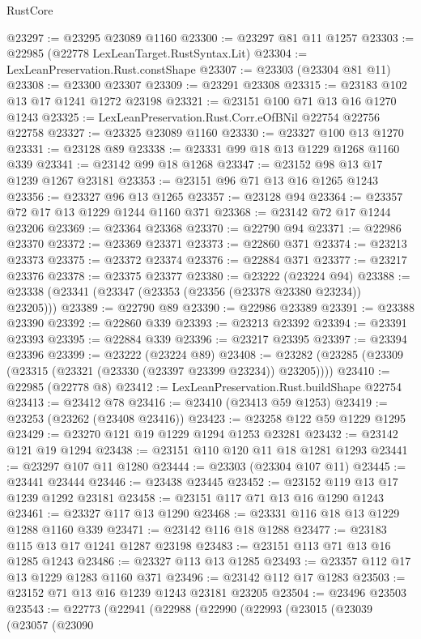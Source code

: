 \begin{lexlean}{RustCore}
\begin{coremodule}
@23297 := @23295 @23089 @1160
@23300 := @23297 @81 @11 @1257
@23303 := @22985 (@22778 LexLeanTarget.RustSyntax.Lit)
@23304 := LexLeanPreservation.Rust.constShape
@23307 := @23303 (@23304 @81 @11)
@23308 := @23300 @23307
@23309 := @23291 @23308
@23315 := @23183 @102 @13 @17 @1241 @1272 @23198
@23321 := @23151 @100 @71 @13 @16 @1270 @1243
@23325 := LexLeanPreservation.Rust.Corr.eOfBNil @22754 @22756 @22758
@23327 := @23325 @23089 @1160
@23330 := @23327 @100 @13 @1270
@23331 := @23128 @89
@23338 := @23331 @99 @18 @13 @1229 @1268 @1160 @339
@23341 := @23142 @99 @18 @1268
@23347 := @23152 @98 @13 @17 @1239 @1267 @23181
@23353 := @23151 @96 @71 @13 @16 @1265 @1243
@23356 := @23327 @96 @13 @1265
@23357 := @23128 @94
@23364 := @23357 @72 @17 @13 @1229 @1244 @1160 @371
@23368 := @23142 @72 @17 @1244 @23206
@23369 := @23364 @23368
@23370 := @22790 @94
@23371 := @22986 @23370
@23372 := @23369 @23371
@23373 := @22860 @371
@23374 := @23213 @23373
@23375 := @23372 @23374
@23376 := @22884 @371
@23377 := @23217 @23376
@23378 := @23375 @23377
@23380 := @23222 (@23224 @94)
@23388 := @23338 (@23341 (@23347 (@23353 (@23356 (@23378 @23380 @23234)) @23205)))
@23389 := @22790 @89
@23390 := @22986 @23389
@23391 := @23388 @23390
@23392 := @22860 @339
@23393 := @23213 @23392
@23394 := @23391 @23393
@23395 := @22884 @339
@23396 := @23217 @23395
@23397 := @23394 @23396
@23399 := @23222 (@23224 @89)
@23408 := @23282 (@23285 (@23309 (@23315 (@23321 (@23330 (@23397 @23399 @23234)) @23205))))
@23410 := @22985 (@22778 @8)
@23412 := LexLeanPreservation.Rust.buildShape @22754
@23413 := @23412 @78
@23416 := @23410 (@23413 @59 @1253)
@23419 := @23253 (@23262 (@23408 @23416))
@23423 := @23258 @122 @59 @1229 @1295
@23429 := @23270 @121 @19 @1229 @1294 @1253 @23281
@23432 := @23142 @121 @19 @1294
@23438 := @23151 @110 @120 @11 @18 @1281 @1293
@23441 := @23297 @107 @11 @1280
@23444 := @23303 (@23304 @107 @11)
@23445 := @23441 @23444
@23446 := @23438 @23445
@23452 := @23152 @119 @13 @17 @1239 @1292 @23181
@23458 := @23151 @117 @71 @13 @16 @1290 @1243
@23461 := @23327 @117 @13 @1290
@23468 := @23331 @116 @18 @13 @1229 @1288 @1160 @339
@23471 := @23142 @116 @18 @1288
@23477 := @23183 @115 @13 @17 @1241 @1287 @23198
@23483 := @23151 @113 @71 @13 @16 @1285 @1243
@23486 := @23327 @113 @13 @1285
@23493 := @23357 @112 @17 @13 @1229 @1283 @1160 @371
@23496 := @23142 @112 @17 @1283
@23503 := @23152 @71 @13 @16 @1239 @1243 @23181 @23205
@23504 := @23496 @23503
@23543 := @22773
    (@22941
      (@22988
        (@22990
          (@22993
            (@23015
              (@23039
                (@23057
                  (@23090

\end{coremodule}
\end{lexlean}

